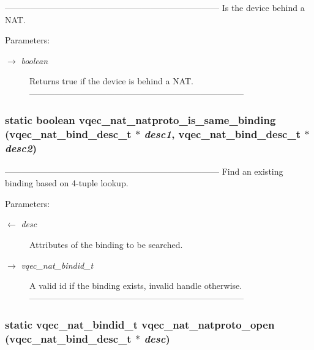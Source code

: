 --------------------------------------------------------------------------- Is the device behind a NAT.

\begin{Desc}
\item[Parameters:]
\begin{description}
\item[\mbox{$\rightarrow$} {\em boolean}]Returns true if the device is behind a NAT. --------------------------------------------------------------------------- \end{description}
\end{Desc}
\subsubsection{\setlength{\rightskip}{0pt plus 5cm}static boolean vqec\_\-nat\_\-natproto\_\-is\_\-same\_\-binding (vqec\_\-nat\_\-bind\_\-desc\_\-t $\ast$ {\em desc1}, vqec\_\-nat\_\-bind\_\-desc\_\-t $\ast$ {\em desc2})\hspace{0.3cm}{\tt  [inline, static]}}\label{vqec__nat__natproto_8c_261af32fb1b0da5bedaa967988468e2a}


--------------------------------------------------------------------------- Find an existing binding based on 4-tuple lookup.

\begin{Desc}
\item[Parameters:]
\begin{description}
\item[\mbox{$\leftarrow$} {\em desc}]Attributes of the binding to be searched. \item[\mbox{$\rightarrow$} {\em vqec\_\-nat\_\-bindid\_\-t}]A valid id if the binding exists, invalid handle otherwise. --------------------------------------------------------------------------- \end{description}
\end{Desc}
\subsubsection{\setlength{\rightskip}{0pt plus 5cm}static vqec\_\-nat\_\-bindid\_\-t vqec\_\-nat\_\-natproto\_\-open (vqec\_\-nat\_\-bind\_\-desc\_\-t $\ast$ {\em desc})\hspace{0.3cm}{\tt  [static]}}\label{vqec__nat__natproto_8c_1929976ff61736d21ebb3662de253ffc}


